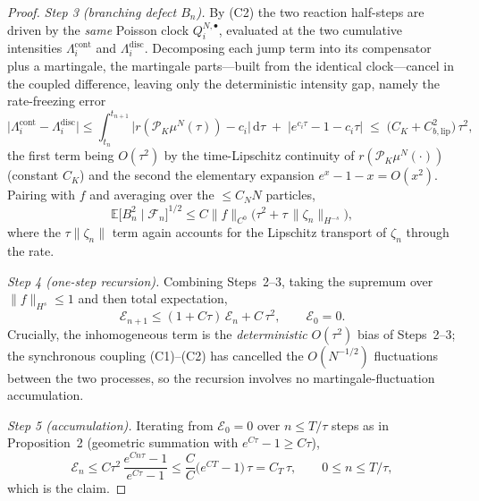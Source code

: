 \documentclass[12pt]{article}
\begin{document}
\begin{proof}
\smallskip
\noindent\emph{Step 3 (branching defect $B_n$).}
By (C2) the two reaction half-steps are driven by the \emph{same} Poisson clock
$Q^{N,\bullet}_i$, evaluated at the two cumulative intensities
$\Lambda^{\mathrm{cont}}_i$ and $\Lambda^{\mathrm{disc}}_i$. Decomposing each jump
term into its compensator plus a martingale, the martingale parts---built from
the identical clock---cancel in the coupled difference, leaving only the
deterministic intensity gap, namely the rate-freezing error
\[
\big|\Lambda^{\mathrm{cont}}_i-\Lambda^{\mathrm{disc}}_i\big|
\le \int_{t_n}^{t_{n+1}}\big|r(\mathcal P_K\mu^N(\tau))-c_i\big|\,\mathrm d\tau
\;+\;\big|e^{c_i\tau}-1-c_i\tau\big|
\;\le\; \big(C_K + C_{b,\mathrm{lip}}^2\big)\,\tau^2,
\]
the first term being $O(\tau^2)$ by the time-Lipschitz continuity of
$r(\mathcal P_K\mu^N(\cdot))$ (constant $C_K$) and the second the elementary
expansion $e^x-1-x=O(x^2)$. Pairing with $f$ and averaging over the
$\le C_N N$ particles,
\[
\mathbb E\big[B_n^2\mid\mathcal F_n\big]^{1/2}
\le C\|f\|_{C^0}\Big(\tau^2+\tau\,\|\zeta_n\|_{H^{-s}}\Big),
\]
where the $\tau\|\zeta_n\|$ term again accounts for the Lipschitz transport of
$\zeta_n$ through the rate.

\smallskip
\noindent\emph{Step 4 (one-step recursion).}
Combining Steps~2--3, taking the supremum over $\|f\|_{H^s}\le1$ and then total
expectation,
\[
\mathcal E_{n+1}\le (1+C\tau)\,\mathcal E_n + C\,\tau^2,\qquad \mathcal E_0=0 .
\]
Crucially, the inhomogeneous term is the \emph{deterministic} $O(\tau^2)$ bias
of Steps~2--3; the synchronous coupling (C1)--(C2) has cancelled the
$O(N^{-1/2})$ fluctuations between the two processes, so the recursion involves
no martingale-fluctuation accumulation.

\smallskip
\noindent\emph{Step 5 (accumulation).}
Iterating from $\mathcal E_0=0$ over $n\le T/\tau$ steps as in Proposition~2
(geometric summation with $e^{C\tau}-1\ge C\tau$),
\[
\mathcal E_n\le C\tau^2\,\frac{e^{Cn\tau}-1}{e^{C\tau}-1}
\le \frac{C}{C}\big(e^{CT}-1\big)\,\tau=C_T\,\tau,
\qquad 0\le n\le T/\tau,
\]
which is the claim.
\end{proof}
\end{document}
